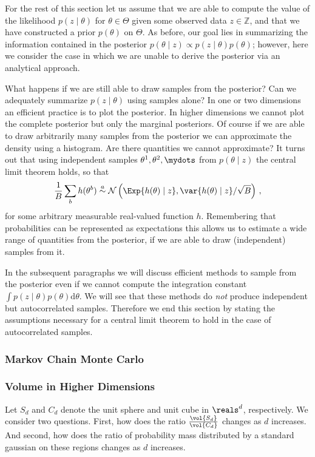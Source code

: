 For the rest of this section let us assume that we are able to compute the value of the likelihood $p(z \mid \theta)$ for $\theta \in \Theta$ given some observed data $z \in \mathbb{Z}$, and that we have constructed a prior $p(\theta)$ on $\Theta$.
As before, our goal lies in summarizing the information contained in the posterior $p(\theta \mid z) \propto p(z \mid \theta) p(\theta)$; however, here we consider the case in which we are unable to derive the posterior via an analytical approach.

What happens if we are still able to draw samples from the posterior?
Can we adequately summarize $p(z \mid \theta)$ using samples alone?
In one or two dimensions an efficient practice is to plot the posterior.
In higher dimensions we cannot plot the complete posterior but only the marginal posteriors.
Of course if we are able to draw arbitrarily many samples from the posterior we can approximate the density using a histogram.
Are there quantities we cannot approximate?
It turns out that using independent samples $\theta^{1},\theta^{2},\mydots$ from $p(\theta \mid z)$ the central limit theorem holds, so that
\begin{align}
  \frac{1}{B} \sum_b h(\theta^{b}) \overset{a}{\sim} \mathcal{N} \left( \Exp{h(\theta) \mid z}, \var{h(\theta) \mid z} / \sqrt{B} \right) \,,
\end{align}
for some arbitrary measurable real-valued function $h$.
Remembering that probabilities can be represented as expectations this allows us to estimate a wide range of quantities from the posterior, if we are able to draw (independent) samples from it.

In the subsequent paragraphs we will discuss efficient methods to sample from the posterior even if we cannot compute the integration constant $\int p(z \mid \theta) p(\theta) \mathrm{d}\theta$.
We will see that these methods do \emph{not} produce independent but autocorrelated samples.
Therefore we end this section by stating the assumptions necessary for a central limit theorem to hold in the case of autocorrelated samples.

\subsubsection*{Markov Chain Monte Carlo}

\subsubsection*{Volume in Higher Dimensions}
Let $S_d$ and $C_d$ denote the unit sphere and unit cube in $\reals^d$, respectively.
We consider two questions.
First, how does the ratio $\frac{\vol{S_d}}{\vol{C_d}}$ changes as $d$ increases.
And second, how does the ratio of probability mass distributed by a standard gaussian on these regions changes as $d$ increases.  


